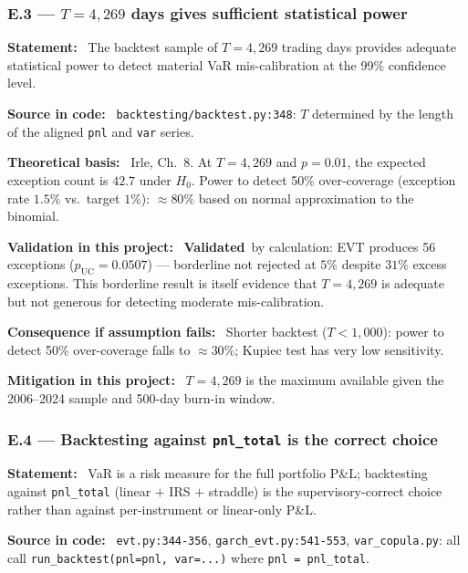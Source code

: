 \documentclass[11pt,a4paper]{article}
\newcommand{\asmfield}[1]{\medskip\noindent\textbf{#1:}\ }
\newcommand{\code}[1]{\texttt{#1}}
\newcommand{\validated}{\textbf{Validated}}
\begin{document}
\subsubsection{E.3 --- $T = 4{,}269$ days gives sufficient statistical power}\label{asm:E3}

\asmfield{Statement}
The backtest sample of $T = 4{,}269$ trading days provides adequate
statistical power to detect material VaR mis-calibration at the 99\%
confidence level.

\asmfield{Source in code}
\code{backtesting/backtest.py:348}: $T$ determined by the length of the
aligned \code{pnl} and \code{var} series.

\asmfield{Theoretical basis}
Irle, Ch.~8. At $T = 4{,}269$ and $p = 0.01$, the expected exception count
is $42.7$ under $H_0$. Power to detect 50\% over-coverage (exception rate
$1.5\%$ vs.\ target $1\%$): $\approx 80\%$ based on normal approximation
to the binomial.

\asmfield{Validation in this project}
\validated\ by calculation: EVT produces 56 exceptions ($p_{\mathrm{UC}}
= 0.0507$) --- borderline not rejected at $5\%$ despite $31\%$ excess
exceptions. This borderline result is itself evidence that $T = 4{,}269$
is adequate but not generous for detecting moderate mis-calibration.

\asmfield{Consequence if assumption fails}
Shorter backtest ($T < 1{,}000$): power to detect 50\% over-coverage falls
to $\approx 30\%$; Kupiec test has very low sensitivity.

\asmfield{Mitigation in this project}
$T = 4{,}269$ is the maximum available given the 2006--2024 sample and
500-day burn-in window.

\subsubsection{E.4 --- Backtesting against \texttt{pnl\_total} is the correct choice}\label{asm:E4}

\asmfield{Statement}
VaR is a risk measure for the full portfolio P\&L; backtesting against
\code{pnl\_total} (linear $+$ IRS $+$ straddle) is the supervisory-correct
choice rather than against per-instrument or linear-only P\&L.

\asmfield{Source in code}
\code{evt.py:344-356}, \code{garch\_evt.py:541-553}, \code{var\_copula.py}:
all call \code{run\_backtest(pnl=pnl, var=...)} where \code{pnl = pnl\_total}.
\end{document}
